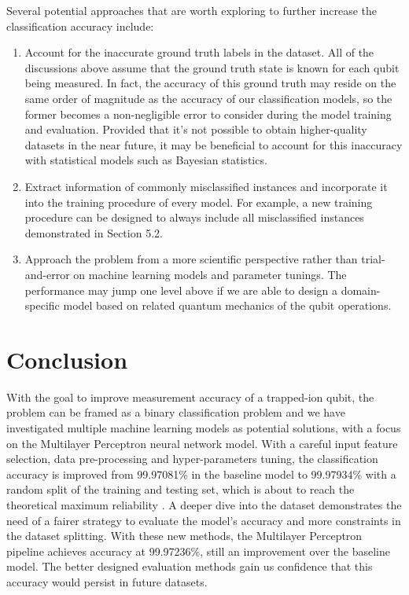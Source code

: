 \documentclass[letterpaper,twocolumn,10pt]{article}
\begin{document}
Several potential approaches that are worth exploring to further increase the classification accuracy include:

\begin{enumerate}
    \item 
    Account for the inaccurate ground truth labels in the dataset. All of the discussions above assume that the ground truth state is known for each qubit being measured. In fact, the accuracy of this ground truth may reside on the same order of magnitude as the accuracy of our classification models, so the former becomes a non-negligible error to consider during the model training and evaluation. Provided that it's not possible to obtain higher-quality datasets in the near future, it may be beneficial to account for this inaccuracy with statistical models such as Bayesian statistics. 

    \item 
    Extract information of commonly misclassified instances and incorporate it into the training procedure of every model. For example, a new training procedure can be designed to always include all misclassified instances demonstrated in Section 5.2.

    \item 
    Approach the problem from a more scientific perspective rather than trial-and-error on machine learning models and parameter tunings. The performance may jump one level above if we are able to design a domain-specific model based on related quantum mechanics of the qubit operations.

\end{enumerate}

\section{Conclusion}

With the goal to improve measurement accuracy of a trapped-ion qubit, the problem can be framed as a binary classification problem and we have investigated multiple machine learning models as potential solutions, with a focus on the Multilayer Perceptron neural network model. With a careful input feature selection, data pre-processing and hyper-parameters tuning, the classification accuracy is improved from 99.97081\% in the baseline model to 99.97934\% with a random split of the training and testing set, which is about to reach the theoretical maximum reliability . A deeper dive into the dataset demonstrates the need of a fairer strategy to evaluate the model's accuracy and more constraints in the dataset splitting. With these new methods, the Multilayer Perceptron pipeline achieves accuracy at 99.97236\%, still an improvement over the baseline model. The better designed evaluation methods gain us confidence that this accuracy would persist in future datasets.
\end{document}
